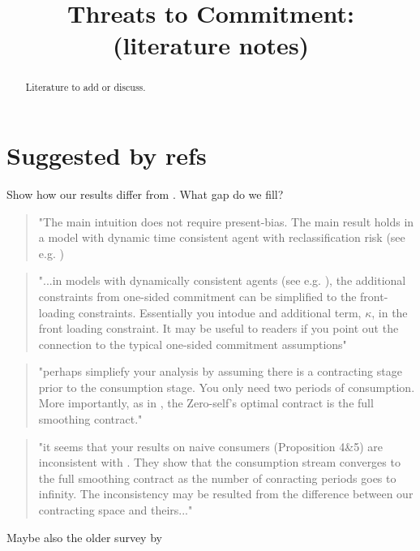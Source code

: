 \documentclass[letterpaper, 12pt]{article}
\title{Threats to Commitment:\\(literature notes)}
\begin{document}
\maketitle
\begin{abstract}
Literature to add or discuss.
\end{abstract}
\tableofcontents
\newpage


\section{Suggested by refs}

Show how our results differ from \citet{gottlieb2021}.  What gap do we fill?
\begin{quotation}
"The main intuition does not require present-bias. The main result holds in a model with dynamic time consistent agent with reclassification risk (see e.g. \citet{hendel2003a})  
\end{quotation}

\begin{quotation}
"...in models with dynamically consistent agents (see e.g. \cite{krueger2006a}), the additional constraints from one-sided commitment can be simplified to the front-loading constraints. Essentially you intodue and additional term, $\kappa$, in the front loading constraint.  It may be useful to readers if you point out the connection to the typical one-sided commitment assumptions"
\end{quotation}


\begin{quotation}
"perhaps simpliefy your analysis by assuming there is a contracting stage prior to the consumption stage. You only need two periods of consumption. More importantly, as in \cite{heidhues2010a}, the Zero-self's optimal contract is the full smoothing contract."
\end{quotation}


\begin{quotation}
"it seems that your results on naive consumers (Proposition 4\&5) are inconsistent with \citet{gottlieb2021}. They show that the consumption stream converges to the full smoothing contract as the number of conracting periods goes to infinity.  The inconsistency may be resulted from the difference between our contracting space and theirs..."
\end{quotation}



Maybe also the older survey by \citet{frederick2002a}
\end{document}

